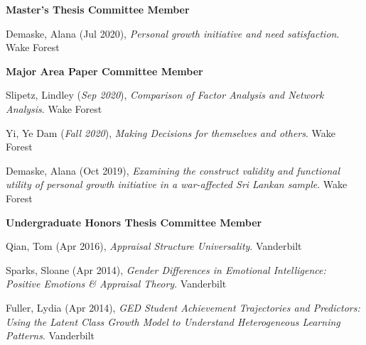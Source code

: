{\large\textbf{Master's Thesis Committee Member}}
\begin{etaremune}%
\item Demaske, Alana (Jul 2020), \textit{Personal growth initiative and need satisfaction}. Wake Forest%
\end{etaremune}%
%
{\large\textbf{Major Area Paper Committee Member}}
\begin{etaremune}%
\item Slipetz, Lindley (\textit{Sep 2020}), \textit{Comparison of Factor Analysis and Network Analysis}. Wake Forest%
\item Yi, Ye Dam (\textit{Fall 2020}), \textit{Making Decisions for themselves and others}. Wake Forest%
\item Demaske, Alana (Oct 2019), \textit{Examining the construct validity and functional utility of personal growth initiative in a war-affected Sri Lankan sample}. Wake Forest%
\end{etaremune}%
%
{\large\textbf{Undergraduate Honors Thesis Committee Member}}
\begin{etaremune}
\item Qian, Tom (Apr 2016), \textit{Appraisal Structure Universality}. Vanderbilt%
%
\item Sparks, Sloane (Apr 2014), \textit{Gender Differences in Emotional Intelligence: Positive Emotions \& Appraisal Theory}. Vanderbilt%
\item Fuller, Lydia (Apr 2014), \textit{GED Student Achievement Trajectories and Predictors: Using the Latent Class Growth Model to Understand Heterogeneous Learning Patterns}. Vanderbilt%
\end{etaremune}

